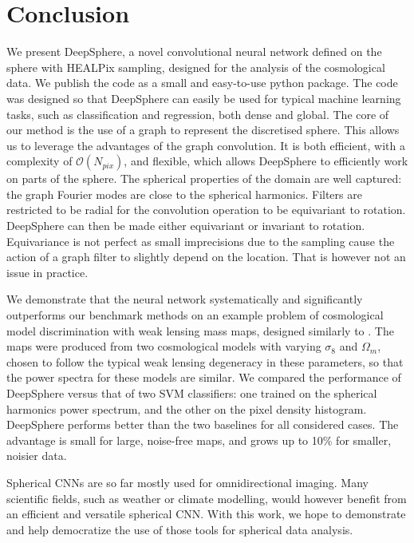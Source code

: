 \documentclass[final,twocolumn,3p,times,sort&compress]{elsarticle}
\newcommand{\1}{\b{1}}              %
\newcommand{\0}{\b{0}}              %
\newcommand{\bO}{\mathcal{O}}
\begin{document}
\section{Conclusion}
\label{sec:conclusion}

We present DeepSphere, a novel convolutional neural network defined on the sphere with HEALPix sampling, designed for the analysis of the cosmological data.
We publish the code as a small and easy-to-use python package.
The code was designed so that DeepSphere can easily be used for typical machine learning tasks, such as classification and regression, both dense and global.
The core of our method is the use of a graph to represent the discretised sphere.
This allows us to leverage the advantages of the graph convolution.
It is both efficient, with a complexity of $\bO(N_{pix})$, and flexible, which allows DeepSphere to efficiently work on parts of the sphere.
The spherical properties of the domain are well captured: the graph Fourier modes are close to the spherical harmonics.
Filters are restricted to be radial for the convolution operation to be equivariant to rotation.
DeepSphere can then be made either equivariant or invariant to rotation.
Equivariance is not perfect as small imprecisions due to the sampling cause the action of a graph filter to slightly depend on the location.
That is however not an issue in practice.

We demonstrate that the neural network systematically and significantly outperforms our benchmark methods on an example problem of cosmological model discrimination with weak lensing mass maps, designed similarly to \citep{schmelze2017cosmologicalmodel}.
The maps were produced from two cosmological models with varying $\sigma_8$ and $\Omega_m$, chosen to follow the typical weak lensing degeneracy in these parameters, so that the power spectra for these models are similar.
We compared the performance of DeepSphere versus that of two SVM classifiers: one trained on the spherical harmonics power spectrum, and the other on the pixel density histogram.
DeepSphere performs better than the two baselines for all considered cases.
The advantage is small for large, noise-free maps, and grows up to 10\% for smaller, noisier data.

Spherical CNNs are so far mostly used for omnidirectional imaging.
Many scientific fields, such as weather or climate modelling, would however benefit from an efficient and versatile spherical CNN.
With this work, we hope to demonstrate and help democratize the use of those tools for spherical data analysis.
\end{document}
